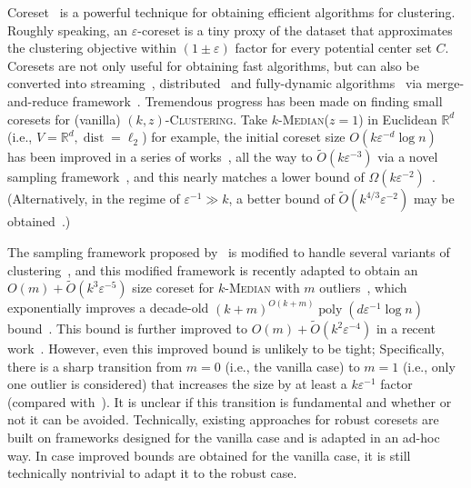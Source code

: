 \documentclass[letterpaper,11pt]{article}
\theoremstyle{plain}
\theoremstyle{definition}
\theoremstyle{remark}
\DeclareMathOperator{\poly}{poly}
\DeclareMathOperator{\dist}{dist}
\newcommand{\eps}{\varepsilon}
\renewcommand{\epsilon}{\varepsilon}
\newcommand{\ProblemName}[1]{\textsc{#1}}
\newcommand{\kMedian}{\ProblemName{$k$-Median}\xspace}
\newcommand{\kzC}{\ProblemName{$(k,z)$-Clustering}\xspace}
\begin{document}
Coreset~\cite{DBLP:conf/stoc/Har-PeledM04} is a powerful technique for obtaining efficient algorithms for clustering.
Roughly speaking, an $\eps$-coreset is a tiny proxy of the dataset that approximates the clustering objective within $(1 \pm \eps)$ factor for every potential center set $C$.
Coresets are not only useful for obtaining fast algorithms,
but can also be converted into streaming~\cite{DBLP:conf/stoc/Har-PeledM04},
distributed~\cite{DBLP:conf/nips/BalcanEL13} and fully-dynamic algorithms~\cite{DBLP:conf/esa/HenzingerK20} via merge-and-reduce framework~\cite{DBLP:conf/stoc/Har-PeledM04}.
Tremendous progress has been made on finding small coresets for (vanilla) \kzC.
Take \kMedian ($z = 1$) in Euclidean $\mathbb{R}^d$ (i.e., $V = \mathbb{R}^d, \dist = \ell_2$) for example,
the initial coreset size $O(k\eps^{-d}\log n)$~\cite{DBLP:conf/stoc/Har-PeledM04} has been improved in a series of works~\cite{DBLP:journals/dcg/Har-PeledK07,Feldman11unified,Sohler18Strong,FeldmanSS20Turning,DBLP:conf/stoc/HuangV20,BJKW21,Cohen-addad2021New,Cohen-Addad22Towards},
all the way to $\tilde{O}(k \epsilon^{-3})$ via a novel sampling framework~\cite{Cohen-addad2021New,Cohen-Addad22Towards},
and this nearly matches a lower bound of $\Omega(k \epsilon^{-2})$~\cite{Cohen-Addad22Towards}. (Alternatively, in the regime of $\epsilon^{-1} \gg k$, a better bound of $\tilde{O}(k^{4/3} \epsilon^{-2})$ may be obtained~\cite{DBLP:conf/nips/Cohen-AddadLSSS22,Huang22OnOptimal}.)


The sampling framework proposed by~\cite{Cohen-addad2021New}
is modified to handle several variants of clustering~\cite{Braverman22Power},
and this modified framework is recently adapted to obtain an $O(m) + \tilde{O}(k^3 \eps^{-5})$ 
size coreset for \kMedian with $m$ outliers~\cite{Huang2022Near-optimal},
which exponentially improves a decade-old $(k+m)^{O(k + m)} \poly(d \eps^{-1} \log n)$ bound~\cite{feldman2012data}.
This bound is further improved to $O(m) + \tilde{O}(k^2 \eps^{-4})$ in a recent work~\cite{Huang2023General}.
However, even this improved bound is unlikely to be tight;
Specifically, there is a sharp transition 
from $m = 0$ (i.e., the vanilla case) to $m = 1$ (i.e., only one outlier is considered) that increases the size by at least a $k \epsilon^{-1}$ factor (compared with~\cite{Cohen-Addad22Towards}).
It is unclear if this transition is fundamental and whether or not it can be avoided.
Technically, existing approaches for robust coresets are built on frameworks designed for the vanilla case and is adapted in an ad-hoc way.
In case improved bounds are obtained for the vanilla case,
it is still technically nontrivial to adapt it to the robust case.
\end{document}

